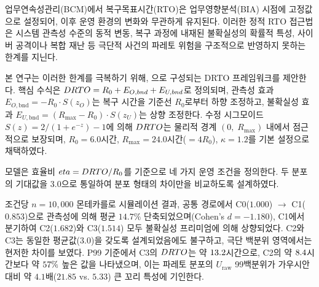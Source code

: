 {\fontsize{11}{22}\selectfont
{}\justifying
\setlength{\parindent}{2em}

업무연속성관리(BCM)에서 복구목표시간(RTO)은 업무영향분석(BIA) 시점에 고정값으로 설정되어, 이후 운영 환경의 변화와 무관하게 유지된다. 이러한 정적 RTO 접근법은 시스템 관측성 수준의 동적 변동, 복구 과정에 내재된 불확실성의 확률적 특성, 사이버 공격이나 복합 재난 등 극단적 사건의 파레토 위험을 구조적으로 반영하지 못하는 한계를 지닌다.

본 연구는 이러한 한계를 극복하기 위해, 으로 구성되는 DRTO 프레임워크를 제안한다. 핵심 수식은 $\DRTO = R_0 + E_{O,\mathrm{bnd}} + E_{U,\mathrm{bnd}}$로 정의되며, 관측성 효과 $E_{O,\mathrm{bnd}} = -R_0 \cdot S(z_O)$는 복구 시간을 기준선 $R_0$로부터 하향 조정하고, 불확실성 효과 $E_{U,\mathrm{bnd}} = (R_{\max} - R_0) \cdot S(z_U)$는 상향 조정한다. 수정 시그모이드 $S(z) = 2/(1 + e^{-z}) - 1$에 의해 $\DRTO$는 물리적 경계 $(0,\; R_{\max})$ 내에서 점근적으로 보장되며, $R_0 = 6.0$시간, $R_{\max} = 24.0$시간($= 4R_0$), $\kappa = 1.2$를 기본 설정으로 채택하였다. 

모델은 효율비 $\eta = \DRTO / R_0$를 기준으로 네 가지 운영 조건을 정의한다.  두 분포의 기대값을 $3.0$으로 통일하여 분포 형태의 차이만을 비교하도록 설계하였다.

조건당 $n = 10{,}000$ 몬테카를로 시뮬레이션 결과, 공통 경로에서 C0($1.000$) $\to$ C1($0.853$)으로 관측성에 의해 평균 $14.7\%$ 단축되었으며(Cohen's $d = -1.180$), C1에서 분기하여 C2($1.682$)와 C3($1.514$) 모두 불확실성 프리미엄에 의해 상향되었다. C2와 C3는 동일한 평균값($3.0$)을 갖도록 설계되었음에도 불구하고, 극단 백분위 영역에서는 현저한 차이를 보였다. P99 기준에서 C3의 $\DRTO$는 약 $\erf{13.2}{22.7}$시간으로, C2의 약 $\erf{8.4}{13.9}$시간보다 약 $\erf{57}{63}\%$ 높은 값을 나타냈으며, 이는 파레토 분포의 $U_{\mathrm{raw}}$ 99백분위가 가우시안 대비 약 $4.1$배($21.85$ vs. $5.33$) 큰 꼬리 특성에 기인한다.

}
